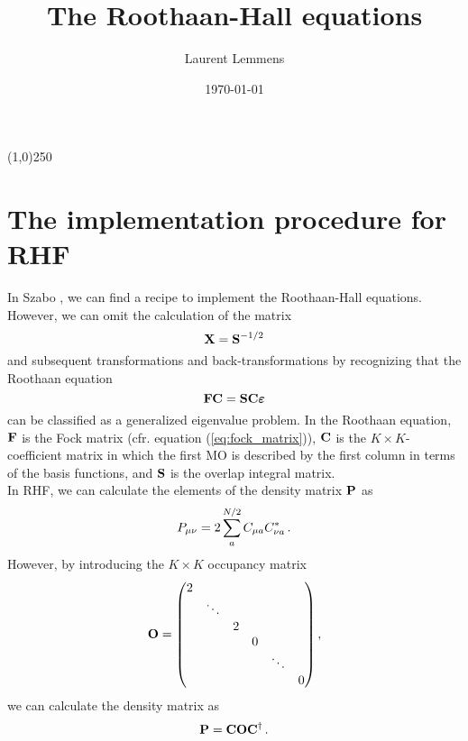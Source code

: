 \documentclass[12pt]{article}
\title{The Roothaan-Hall equations}
\author{Laurent Lemmens}
\date{\today \hspace{6pt} \currenttime}
\begin{document}
\maketitle

\begin{center}
\line(1,0){250}
\end{center}

\tableofcontents
\newpage


\section{The implementation procedure for RHF}
    In Szabo \cite{szabo}, we can find a recipe to implement the Roothaan-Hall equations. However, we can omit the calculation of the matrix
    \begin{equation}
        \vb{X} = \vb{S}^{-1/2}
    \end{equation}
    and subsequent transformations and back-transformations by recognizing that the Roothaan equation
    \begin{equation} \label{eq:roothaan}
        \vb{F} \vb{C} = \vb{S} \vb{C} \boldsymbol{\varepsilon}
    \end{equation}
    can be classified as a generalized eigenvalue problem. In the Roothaan equation, $\vb{F}$ is the Fock matrix (cfr. equation (\ref{eq:fock_matrix})), $\vb{C}$ is the $K \times K$-coefficient matrix in which the first MO is described by the first column in terms of the basis functions, and $\vb{S}$ is the overlap integral matrix. \\

    In RHF, we can calculate the elements of the density matrix $\vb{P}$ as
    \begin{equation}
        P_{\mu \nu} = 2 \sum_a^{N/2} C_{\mu a} C^*_{\nu a} \thinspace .
    \end{equation}
    However, by introducing the $K \times K$ occupancy matrix
    \begin{equation}
        \vb{O} = \mqty(\dmat{2, \ddots, 2, 0, \ddots, 0}) \thinspace ,
    \end{equation}
    we can calculate the density matrix as
    \begin{equation}
        \vb{P} = \vb{C} \vb{O} \vb{C}^\dagger \thinspace .
    \end{equation}
\end{document}
